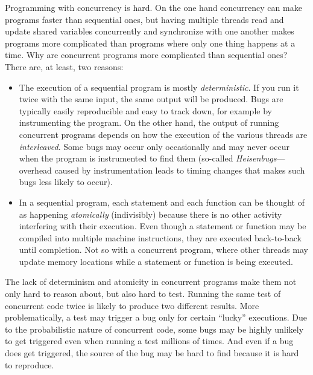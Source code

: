 \documentclass{report}
\begin{document}
Programming with concurrency is hard.  On the one hand concurrency
can make programs faster than sequential ones, but having multiple
%
threads read and update shared variables
%
concurrently and synchronize with one another makes programs more
complicated than programs where only one thing happens at a time.
%
%
%
%
%
%
%
Why are concurrent
programs more complicated than sequential ones?
There are, at least, two reasons:
\begin{itemize}
\item The execution of a sequential
%
program is mostly \emph{deterministic}.
%
If you run it twice with the same input, the same output will be produced.
Bugs are typically easily reproducible and easy to track down, for example
by instrumenting the program.
On the other hand,
the output of running concurrent programs depends on how the
execution of the various threads are \emph{interleaved}.
Some bugs may occur only occasionally and
may never occur when the program is instrumented to find them
(so-called \emph{Heisenbugs}---overhead caused by instrumentation
leads to timing changes that makes such bugs less likely to occur).
%
\item In a sequential program, each statement and each function can be
thought of as happening \emph{atomically} (indivisibly)
%
because there is no other activity interfering with their execution.
Even though a statement or function may
be compiled into multiple machine instructions, they are executed back-to-back
until completion.  Not so with a concurrent program, where other threads
may update memory locations while a statement or function is being executed.
\end{itemize}
The lack of determinism and atomicity in concurrent programs make them
not only hard to reason about, but also hard to test.
%
Running the same test of concurrent code twice is likely to produce
two different results.  More problematically, a test may trigger a
bug only for certain ``lucky'' executions.  Due to the probabilistic
nature of concurrent code, some bugs may be highly unlikely to get
triggered even when running a test millions of times.  And even if
a bug does get triggered, the source of the bug may be hard to find
because it is hard to reproduce.

%
\end{document}
